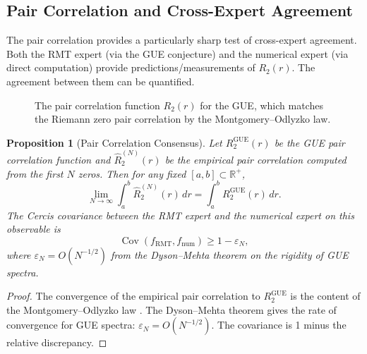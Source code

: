 \documentclass[12pt,a4paper]{article}
\newtheorem{proposition}[theorem]{Proposition}
\theoremstyle{remark}
\newcommand{\R}{\mathbb{R}}
\DeclareMathOperator{\Cov}{Cov}
\begin{document}
\subsection{Pair Correlation and Cross-Expert Agreement}
\label{sec:pair_correlation}
The pair correlation provides a particularly sharp test of cross-expert
agreement. Both the RMT expert (via the GUE conjecture) and the numerical
expert (via direct computation) provide predictions/measurements of
$R_2(r)$. The agreement between them can be quantified.
\begin{figure}[h]
\centering
{}
\caption{The pair correlation function $R_2(r)$ for the GUE, which matches the
Riemann zero pair correlation by the Montgomery--Odlyzko law.}
\label{fig:pair_corr}
\end{figure}
\begin{proposition}[Pair Correlation Consensus]
\label{prop:pair_consensus}
Let $R_2^{\text{GUE}}(r)$ be the GUE pair correlation function and
$\widehat{R}_2^{(N)}(r)$ be the empirical pair correlation computed from
the first $N$ zeros. Then for any fixed $[a,b] \subset \R^+$,
\[
\lim_{N\to\infty} \int_a^b \widehat{R}_2^{(N)}(r)\, dr
= \int_a^b R_2^{\text{GUE}}(r)\, dr.
\]
The Cercis covariance between the RMT expert and the numerical expert on
this observable is
\[
\Cov(f_{\text{RMT}}, f_{\text{num}}) \geq 1 - \varepsilon_N,
\]
where $\varepsilon_N = O(N^{-1/2})$ from the Dyson--Mehta theorem on the
rigidity of GUE spectra.
\end{proposition}
\begin{proof}
The convergence of the empirical pair correlation to $R_2^{\text{GUE}}$
is the content of the Montgomery--Odlyzko law \cite{Montgomery1973, Odlyzko1987}.
The Dyson--Mehta theorem \cite{DysonMehta1963} gives the rate of convergence
for GUE spectra: $\varepsilon_N = O(N^{-1/2})$. The covariance is 1 minus
the relative discrepancy.
\end{proof}
\end{document}
